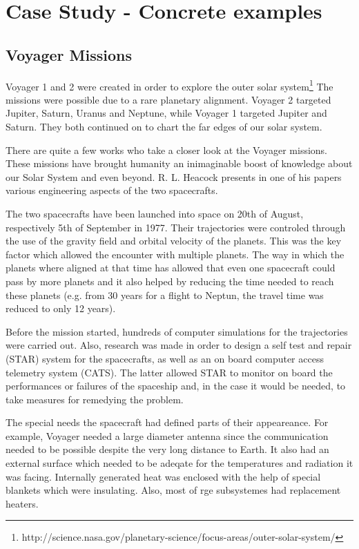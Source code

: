 \section{Case Study - Concrete examples}


\subsection{Voyager Missions}

Voyager 1 and 2 \cite{vo1-nasa}\cite{vo2-nasa} were created in order to explore
the outer solar
system\footnote{http://science.nasa.gov/planetary-science/focus-areas/outer-solar-system/}
The missions were possible due to a rare planetary alignment. Voyager 2 targeted
Jupiter, Saturn, Uranus and Neptune, while Voyager 1 targeted Jupiter and
Saturn. They both continued on to chart the far edges of our solar system.

There are quite a few works who take a closer look at the Voyager missions.
These missions have brought humanity an inimaginable boost of knowledge about
our Solar System and even beyond. R. L. Heacock presents in one of his
papers\cite{tvs} various engineering aspects of the two spacecrafts.

The two spacecrafts have been launched into space on 20th of August,
respectively 5th of September in 1977. Their trajectories were controled through
the use of the gravity field and orbital velocity of the planets. This was the
key factor which allowed the encounter with multiple planets. The way in which
the planets where aligned at that time has allowed that even one spacecraft
could pass by more planets and it also helped by reducing the time needed to
reach these planets (e.g. from 30 years for a flight to Neptun, the travel time
was reduced to only 12 years).

Before the mission started, hundreds of computer simulations for the
trajectories were carried out. Also, research was made in order to design a self
test and repair (STAR) system for the spacecrafts, as well as an on board
computer access telemetry system (CATS). The latter allowed STAR to monitor on
board the performances or failures of the spaceship and, in the case it would be
needed, to take measures for remedying the problem.

The special needs the spacecraft had defined parts of their appeareance. For
example, Voyager needed a large diameter antenna since the communication needed
to be possible despite the very long distance to Earth. It also had an external
surface which needed to be adeqate for the temperatures and radiation it was
facing. Internally generated heat was enclosed with the help of special blankets
which were insulating. Also, most of rge subsystemes had replacement heaters.

